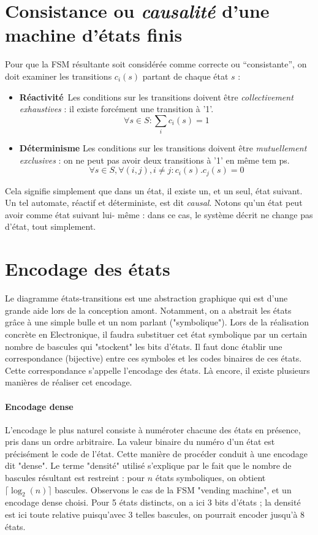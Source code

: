 \section{Consistance ou {\it causalité} d'une machine d'états finis}

Pour que la FSM résultante soit considérée comme correcte ou ``consistante'', on doit examiner les
 transitions $c_i(s)$ partant de chaque état $s$ :
\begin{itemize}
\item \textbf{Réactivité} Les conditions sur les transitions doivent être {\it collectivement exhaustives} : il existe forcément une transition à '1'.
$$\forall s \in S : \sum_i c_i(s)=1$$
\item \textbf{Déterminisme} Les conditions sur les transitions doivent être {\it mutuellement exclusives} : on ne peut pas avoir deux transitions à '1' en même tem
ps.
$$\forall s \in S, \forall (i,j), i\neq j : c_i(s).c_j(s)=0$$
\end{itemize}

Cela signifie simplement que dans un état, il existe un, et un seul, état suivant.
Un tel automate, réactif et déterministe, est dit {\it causal}. Notons qu'un état peut avoir comme état suivant lui-
même : dans ce cas, le système décrit ne change pas d'état, tout simplement. \\

\section{Encodage des états}
Le diagramme états-transitions est une abstraction graphique qui est d'une grande aide lors de la conception amont.
Notamment, on a abstrait les états grâce à une simple bulle et un nom parlant ("symbolique"). Lors de la réalisation
concrète en Electronique, il faudra substituer cet état symbolique par un certain nombre de bascules qui "stockent" les bits d'états.
Il faut donc établir une correspondance (bijective) entre ces symboles et les codes binaires de ces états. Cette
correspondance s'appelle l'encodage des états. Là encore, il existe plusieurs manières de réaliser cet encodage.

\paragraph{Encodage dense}
L'encodage le plus naturel consiste à numéroter chacune des états en présence, pris dans un ordre arbitraire. La valeur binaire du numéro d'un état est
précisément le code de l'état. Cette manière de procéder conduit à une encodage dit "dense". Le terme "densité" utilisé
s'explique par le fait que le nombre de bascules résultant est restreint : pour $n$ états symboliques, on obtient
$\lceil \log_2(n) \rceil$ bascules. Observons le cas de la FSM "vending machine", et un encodage dense choisi. Pour 5 états
distincts, on a ici 3 bits d'états ; la densité est ici toute relative puisqu'avec 3 telles bascules, on pourrait encoder
jusqu'à 8 états.

